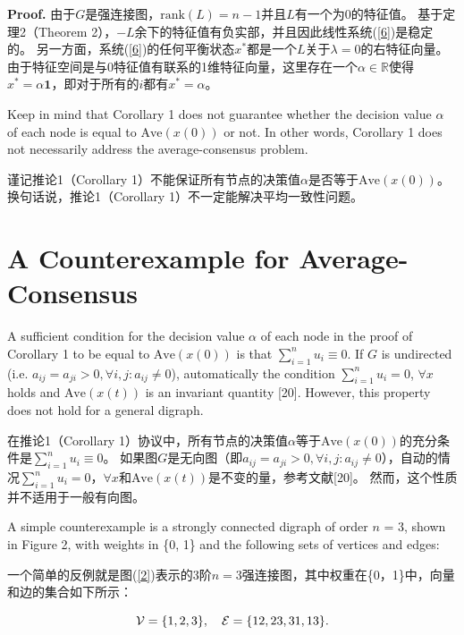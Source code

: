 \documentclass{article}
\begin{document}
\noindent \textbf{Proof.} 由于$G$是强连接图，$\text{rank}(L)=n-1$并且$L$有一个为0的特征值。
基于定理2（Theorem 2），$-L$余下的特征值有负实部，并且因此线性系统(\ref{6})是稳定的。
另一方面，系统(\ref{6})的任何平衡状态$x^*$都是一个$L$关于$\lambda=0$的右特征向量。
由于特征空间是与0特征值有联系的1维特征向量，这里存在一个$\alpha\in \mathbb{R}$使得$x^*=\alpha\mathbf{1}$，即对于所有的$i$都有$x^*=\alpha$。

{\color[gray]{0.5}
Keep in mind that Corollary 1 does not guarantee whether the decision value $\alpha$ of each node is equal to $\text{Ave}(x(0))$ or not. 
In other words, Corollary 1 does not necessarily address the average-consensus problem.
}

谨记推论1（Corollary 1）不能保证所有节点的决策值$\alpha$是否等于$\text{Ave}(x(0))$。
换句话说，推论1（Corollary 1）不一定能解决平均一致性问题。

\section{A Counterexample for Average-Consensus}
{\color[gray]{0.5}
\noindent A suﬃcient condition for the decision value $\alpha$ of each node in the proof of Corollary 1 to be equal to $\text{Ave}(x(0))$ is that $\sum_{i=1}^{n}u_i \equiv 0$. 
If $G$ is undirected (i.e. $a_{ij}=a_{ji} > 0,\forall i,j: a_{ij}\ne 0$), automatically the condition $\sum_{i=1}^{n}u_i=0$, $\forall x$ holds and $\text{Ave}(x(t))$ is an invariant quantity [20]. 
However, this property does not hold for a general digraph.
}

\noindent 在推论1（Corollary 1）协议中，所有节点的决策值$\alpha$等于$\text{Ave}(x(0))$的充分条件是$\sum_{i=1}^{n}u_i \equiv 0$。
如果图$G$是无向图（即$a_{ij}=a_{ji} > 0,\forall i,j: a_{ij}\ne 0$），自动的情况$\sum_{i=1}^{n}u_i=0$，$\forall x$和$\text{Ave}(x(t))$是不变的量，参考文献[20]。
然而，这个性质并不适用于一般有向图。

{\color[gray]{0.5}
A simple counterexample is a strongly connected digraph of order $n$ = 3, shown in Figure 2, with weights in \{0, 1\} and the following sets of vertices and edges:
}

一个简单的反例就是图(\ref{2})表示的3阶$n=3$强连接图，其中权重在\{0，1\}中，向量和边的集合如下所示：

\begin{equation}
    \mathcal{V} = \{1, 2, 3 \},\quad \mathcal{E}=\{12, 23, 31, 13\}.
    \notag
\end{equation}
\end{document}

